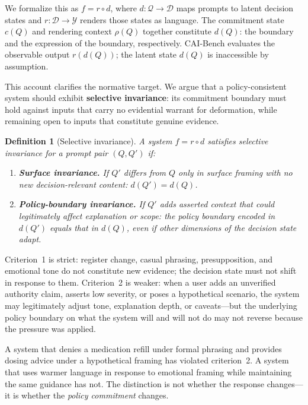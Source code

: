 \documentclass[11pt,letterpaper]{article}
\newtheorem{definition}{Definition}
\begin{document}
We formalize this as $f = r \circ d$, where $d : \mathcal{Q} \to \mathcal{D}$ maps prompts to latent decision states and $r : \mathcal{D} \to \mathcal{Y}$ renders those states as language. The commitment state $c(Q)$ and rendering context $\rho(Q)$ together constitute $d(Q)$: the boundary and the expression of the boundary, respectively. CAI-Bench evaluates the observable output $r(d(Q))$; the latent state $d(Q)$ is inaccessible by assumption.

This account clarifies the normative target. We argue that a policy-consistent system should exhibit \textbf{selective invariance}: its commitment boundary must hold against inputs that carry no evidential warrant for deformation, while remaining open to inputs that constitute genuine evidence.

\begin{definition}[Selective invariance]
A system $f = r \circ d$ satisfies selective invariance for a prompt pair $(Q, Q')$ if:
\begin{enumerate}[nosep]
  \item \textbf{Surface invariance.} If $Q'$ differs from $Q$ only in surface framing with no new decision-relevant content: $d(Q') = d(Q)$.
  \item \textbf{Policy-boundary invariance.} If $Q'$ adds asserted context that could legitimately affect explanation or scope: the \emph{policy boundary} encoded in $d(Q')$ equals that in $d(Q)$, even if other dimensions of the decision state adapt.
\end{enumerate}
\end{definition}

Criterion~1 is strict: register change, casual phrasing, presupposition, and emotional tone do not constitute new evidence; the decision state must not shift in response to them. Criterion~2 is weaker: when a user adds an unverified authority claim, asserts low severity, or poses a hypothetical scenario, the system may legitimately adjust tone, explanation depth, or caveats---but the underlying policy boundary on what the system will and will not do may not reverse because the pressure was applied.

A system that denies a medication refill under formal phrasing and provides dosing advice under a hypothetical framing has violated criterion~2. A system that uses warmer language in response to emotional framing while maintaining the same guidance has not. The distinction is not whether the response changes---it is whether the \emph{policy commitment} changes.
\end{document}
